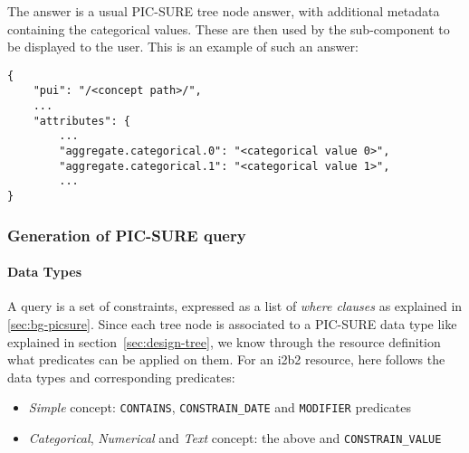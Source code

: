 The answer is a usual PIC-SURE tree node answer, with additional metadata containing the categorical values.
These are then used by the sub-component to be displayed to the user.
This is an example of such an answer:

\begin{samepage}
\begin{verbatim}
{
    "pui": "/<concept path>/",
    ...
    "attributes": {
        ...
        "aggregate.categorical.0": "<categorical value 0>",
        "aggregate.categorical.1": "<categorical value 1>",
        ...
}
\end{verbatim}
\end{samepage}


\subsubsection{Generation of PIC-SURE query}
\label{sec:gb-query}

\paragraph{Data Types}
A query is a set of constraints, expressed as a list of \emph{where clauses} as explained in \ref{sec:bg-picsure}.
Since each tree node is associated to a PIC-SURE data type like explained in section~\ref{sec:design-tree}, we know through the resource definition what predicates can be applied on them.
For an i2b2 resource, here follows the data types and corresponding predicates:
\begin{itemize}
    \setlength\itemsep{0em}

    \item \emph{Simple} concept: \verb|CONTAINS|, \verb|CONSTRAIN_DATE| and \verb|MODIFIER| predicates
    \item \emph{Categorical}, \emph{Numerical} and \emph{Text} concept: the above and \verb|CONSTRAIN_VALUE|
\end{itemize}

